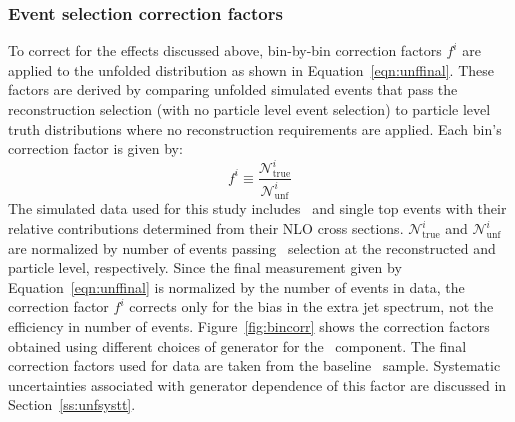 \subsubsection{Event selection correction factors}
\label{ss:unfcorr}

To correct for the effects discussed above, bin-by-bin correction factors $f^i$ are applied to the 
unfolded distribution as shown in Equation~\ref{eqn:unffinal}. These factors are derived by 
comparing unfolded simulated events that pass the reconstruction selection (with no particle level event selection) to
particle level truth distributions where no reconstruction requirements are applied.
Each bin's correction factor is given by:
\begin{equation}
f^i \equiv \frac{{\mathscr N}^i_{\textrm{true}}} {{\mathscr N}^i_{\textrm{unf}}}
\label{eqn:corrf}
\end{equation}
The simulated data used for this study includes \ttbar\ and single top events with their relative contributions determined
from their NLO cross sections. ${\mathscr N}^i_{\textrm{true}}$ and ${\mathscr N}^i_{\textrm{unf}}$ are normalized by number of events passing \emubb\ selection at the reconstructed and particle level, respectively. Since the final measurement given by Equation~\ref{eqn:unffinal} is normalized by the number of events in data, the correction factor $f^i$ corrects only for the bias in the extra jet spectrum, not the efficiency in number of events.
Figure~\ref{fig:bincorr} shows the correction factors obtained using different choices of generator for the \ttbar\ component.
The final correction factors used for data are taken from the baseline \powpy\ sample. Systematic uncertainties associated with generator dependence of this factor are discussed in Section~\ref{ss:unfsystt}.





